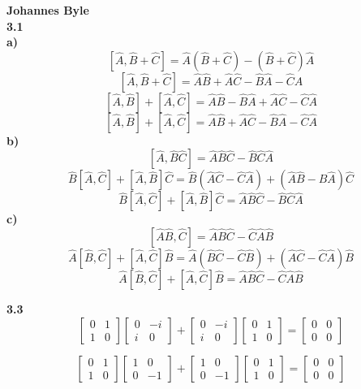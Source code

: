 \documentclass[english]{article}
\begin{document}
\begin{multicols*}{2}
\textbf{Johannes Byle}\\

\noindent
\textbf{3.1}\\
\textbf{a)} $$\left[\hat{A}, \hat{B}+\hat{C}\right]=\hat{A}\left(\hat{B}+\hat{C}\right)-\left(\hat{B}+\hat{C}\right)\hat{A}$$
$$\left[\hat{A}, \hat{B}+\hat{C}\right]=\hat{A}\hat{B}+\hat{A}\hat{C}-\hat{B}\hat{A}-\hat{C}\hat{A}$$
$$\left[\hat{A}, \hat{B}\right]+\left[\hat{A}, \hat{C}\right]=\hat{A}\hat{B}-\hat{B}\hat{A}+\hat{A}\hat{C}-\hat{C}\hat{A}$$
$$\left[\hat{A}, \hat{B}\right]+\left[\hat{A}, \hat{C}\right]=\hat{A}\hat{B}+\hat{A}\hat{C}-\hat{B}\hat{A}-\hat{C}\hat{A}$$
\textbf{b)} $$\left[\hat{A}, \hat{B}\hat{C}\right]=\hat{A}\hat{B}\hat{C}-\hat{B}\hat{C}\hat{A}$$
$$\hat{B}\left[\hat{A},\hat{C}\right]+\left[\hat{A}, \hat{B}\right]\hat{C}=\hat{B}\left(\hat{A}\hat{C}-\hat{C}\hat{A}\right)+\left(\hat{A}\hat{B}-\hat{B}\hat{A}\right)\hat{C}$$
$$\hat{B}\left[\hat{A},\hat{C}\right]+\left[\hat{A}, \hat{B}\right]\hat{C}=\hat{A}\hat{B}\hat{C}-\hat{B}\hat{C}\hat{A}$$
\textbf{c)} $$\left[\hat{A}\hat{B}, \hat{C}\right]=\hat{A}\hat{B}\hat{C}-\hat{C}\hat{A}\hat{B}$$
$$\hat{A}\left[\hat{B},\hat{C}\right]+\left[\hat{A}, \hat{C}\right]\hat{B}=\hat{A}\left(\hat{B}\hat{C}-\hat{C}\hat{B}\right)+\left(\hat{A}\hat{C}-\hat{C}\hat{A}\right)\hat{B}$$
$$\hat{A}\left[\hat{B},\hat{C}\right]+\left[\hat{A}, \hat{C}\right]\hat{B}=\hat{A}\hat{B}\hat{C}-\hat{C}\hat{A}\hat{B}$$

\noindent
\textbf{3.3}\\
\[
\begin{bmatrix}
0&1\\
1&0
\end{bmatrix}
\begin{bmatrix}
0&-i\\
i&0
\end{bmatrix}
+
\begin{bmatrix}
0&-i\\
i&0
\end{bmatrix}
\begin{bmatrix}
0&1\\
1&0
\end{bmatrix}
=
\begin{bmatrix}
0&0\\
0&0
\end{bmatrix}
\]

\[
\begin{bmatrix}
0&1\\
1&0
\end{bmatrix}
\begin{bmatrix}
1&0\\
0&-1
\end{bmatrix}
+
\begin{bmatrix}
1&0\\
0&-1
\end{bmatrix}
\begin{bmatrix}
0&1\\
1&0
\end{bmatrix}
=
\begin{bmatrix}
0&0\\
0&0
\end{bmatrix}
\]


\end{multicols*}
\end{document}
